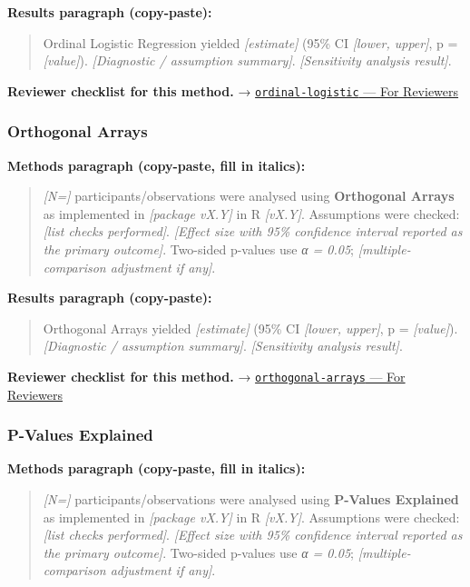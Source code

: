 \documentclass[
]{article}
\begin{document}
\textbf{Results paragraph (copy-paste):}

\begin{quote}
Ordinal Logistic Regression yielded \emph{{[}estimate{]}} (95\% CI
\emph{{[}lower, upper{]}}, p = \emph{{[}value{]}}). \emph{{[}Diagnostic
/ assumption summary{]}}. \emph{{[}Sensitivity analysis result{]}}.
\end{quote}

\textbf{Reviewer checklist for this method.} →
\href{../chapters/07-regression/ordinal-logistic.Rmd\#for-reviewers}{\texttt{ordinal-logistic}
--- For Reviewers}

\subsubsection{Orthogonal Arrays}\label{orthogonal-arrays}

\textbf{Methods paragraph (copy-paste, fill in italics):}

\begin{quote}
\emph{{[}N={]}} participants/observations were analysed using
\textbf{Orthogonal Arrays} as implemented in \emph{{[}package vX.Y{]}}
in R \emph{{[}vX.Y{]}}. Assumptions were checked: \emph{{[}list checks
performed{]}}. \emph{{[}Effect size with 95\% confidence interval
reported as the primary outcome{]}}. Two-sided p-values use \emph{α =
0.05}; \emph{{[}multiple-comparison adjustment if any{]}}.
\end{quote}

\textbf{Results paragraph (copy-paste):}

\begin{quote}
Orthogonal Arrays yielded \emph{{[}estimate{]}} (95\% CI \emph{{[}lower,
upper{]}}, p = \emph{{[}value{]}}). \emph{{[}Diagnostic / assumption
summary{]}}. \emph{{[}Sensitivity analysis result{]}}.
\end{quote}

\textbf{Reviewer checklist for this method.} →
\href{../chapters/16-design/orthogonal-arrays.Rmd\#for-reviewers}{\texttt{orthogonal-arrays}
--- For Reviewers}

\subsubsection{P-Values Explained}\label{p-values-explained}

\textbf{Methods paragraph (copy-paste, fill in italics):}

\begin{quote}
\emph{{[}N={]}} participants/observations were analysed using
\textbf{P-Values Explained} as implemented in \emph{{[}package vX.Y{]}}
in R \emph{{[}vX.Y{]}}. Assumptions were checked: \emph{{[}list checks
performed{]}}. \emph{{[}Effect size with 95\% confidence interval
reported as the primary outcome{]}}. Two-sided p-values use \emph{α =
0.05}; \emph{{[}multiple-comparison adjustment if any{]}}.
\end{quote}
\end{document}
